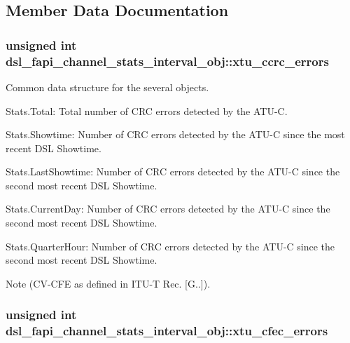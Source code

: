 \subsection{Member Data Documentation}
\hypertarget{structdsl__fapi__channel__stats__interval__obj_a20758418fd88fbef1953137ba98cc341}{
\subsubsection[{xtu\-\_\-ccrc\-\_\-errors}]{\setlength{\rightskip}{0pt plus 5cm}unsigned int dsl\-\_\-fapi\-\_\-channel\-\_\-stats\-\_\-interval\-\_\-obj\-::xtu\-\_\-ccrc\-\_\-errors}}\label{structdsl__fapi__channel__stats__interval__obj_a20758418fd88fbef1953137ba98cc341}
Common data structure for the several objects.
\begin{DoxyItemize}
\item Stats.\-Total\-: Total number of C\-R\-C errors detected by the A\-T\-U-\/\-C.
\item Stats.\-Showtime\-: Number of C\-R\-C errors detected by the A\-T\-U-\/\-C since the most recent D\-S\-L Showtime.
\item Stats.\-Last\-Showtime\-: Number of C\-R\-C errors detected by the A\-T\-U-\/\-C since the second most recent D\-S\-L Showtime.
\item Stats.\-Current\-Day\-: Number of C\-R\-C errors detected by the A\-T\-U-\/\-C since the second most recent D\-S\-L Showtime.
\item Stats.\-Quarter\-Hour\-: Number of C\-R\-C errors detected by the A\-T\-U-\/\-C since the second most recent D\-S\-L Showtime. \begin{DoxyNote}{Note}
(C\-V-\/\-C\-F\-E as defined in I\-T\-U-\/\-T Rec. \mbox{[}G..\mbox{]}). 
\end{DoxyNote}

\end{DoxyItemize}\hypertarget{structdsl__fapi__channel__stats__interval__obj_af819a585cceb04f1d9c95082442318e2}{
\subsubsection[{xtu\-\_\-cfec\-\_\-errors}]{\setlength{\rightskip}{0pt plus 5cm}unsigned int dsl\-\_\-fapi\-\_\-channel\-\_\-stats\-\_\-interval\-\_\-obj\-::xtu\-\_\-cfec\-\_\-errors}}\label{structdsl__fapi__channel__stats__interval__obj_af819a585cceb04f1d9c95082442318e2}
